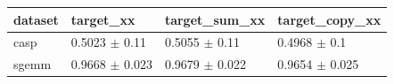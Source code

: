 \begin{tabular}{llll}
\toprule
dataset & target\_xx & target\_sum\_xx & target\_copy\_xx \\
\midrule
casp & 0.5023 $\pm$ 0.11 & 0.5055 $\pm$ 0.11 & 0.4968 $\pm$ 0.1 \\
sgemm & 0.9668 $\pm$ 0.023 & 0.9679 $\pm$ 0.022 & 0.9654 $\pm$ 0.025 \\
\bottomrule
\end{tabular}
